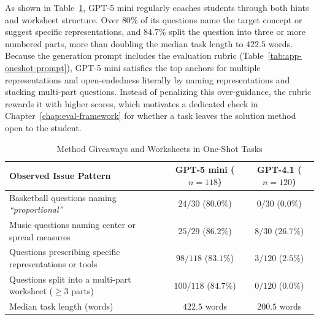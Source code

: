 As shown in Table~\ref{tab:oneshot-hint-worksheet-counts}, GPT-5 mini regularly coaches students through both hints and worksheet structure. Over $80\%$ of its questions name the target concept or suggest specific representations, and $84.7\%$ split the question into three or more numbered parts, more than doubling the median task length to $422.5$ words. Because the generation prompt includes the evaluation rubric (Table~\ref{tab:app-oneshot-prompt}), GPT-5 mini satisfies the top anchors for multiple representations and open-endedness literally by naming representations and stacking multi-part questions. Instead of penalizing this over-guidance, the rubric rewards it with higher scores, which motivates a dedicated check in Chapter~\ref{chap:eval-framework} for whether a task leaves the solution method open to the student.

\begin{table}[!htb]
\centering
\caption[Method Giveaways and Worksheets in One-Shot Tasks]{Method Giveaways and Worksheets in One-Shot Tasks}
\label{tab:oneshot-hint-worksheet-counts}
\footnotesize
\setlength{\tabcolsep}{10pt}
\renewcommand{\arraystretch}{1.35}
\begin{tabular}{@{} >{\raggedright\arraybackslash}p{} c c @{}}
\toprule
\textbf{Observed Issue Pattern} & \textbf{GPT-5 mini ($n = 118$)} & \textbf{GPT-4.1 ($n = 120$)} \\
\midrule
Basketball questions naming \emph{``proportional''} & $24 / 30$ ($80.0\%$) & $0 / 30$ ($0.0\%$) \\
\addlinespace[3pt]
Music questions naming center or spread measures & $25 / 29$ ($86.2\%$) & $8 / 30$ ($26.7\%$) \\
\addlinespace[3pt]
Questions prescribing specific representations or tools & $98 / 118$ ($83.1\%$) & $3 / 120$ ($2.5\%$) \\
\addlinespace[3pt]
Questions split into a multi-part worksheet ($\ge 3$ parts) & $100 / 118$ ($84.7\%$) & $0 / 120$ ($0.0\%$) \\
\addlinespace[3pt]
Median task length (words) & $422.5$ words & $200.5$ words \\
\bottomrule
\end{tabular}
\end{table}

